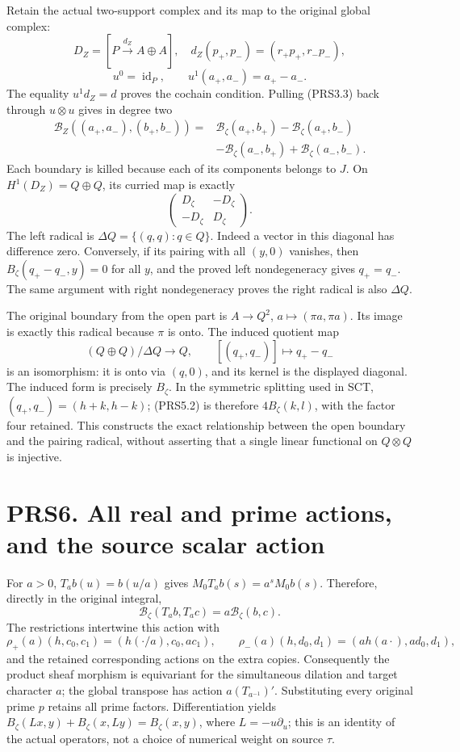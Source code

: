 Retain the actual two-support complex and its map to the original global
complex: \[
D_Z=[P\xrightarrow{d_Z}A\oplus A],\quad
d_Z(p_+,p_-)=(r_+p_+,r_-p_-),
\] \[
u^0=\operatorname{id}_P,\qquad u^1(a_+,a_-)=a_+-a_-.
\tag{PRS5.1}
\] The equality \(u^1d_Z=d\) proves the cochain condition. Pulling
(PRS3.3) back through \(u\otimes u\) gives in degree two \[
\begin{aligned}
\mathcal B_Z((a_+,a_-),(b_+,b_-))={}&\mathcal B_\zeta(a_+,b_+)-\mathcal B_\zeta(a_+,b_-)\\
&-\mathcal B_\zeta(a_-,b_+)+\mathcal B_\zeta(a_-,b_-).
\end{aligned}
\tag{PRS5.2}
\] Each boundary is killed because each of its components belongs to
\(J\). On \(H^1(D_Z)=Q\oplus Q\), its curried map is exactly \[
\begin{pmatrix}D_\zeta&-D_\zeta\\-D_\zeta&D_\zeta\end{pmatrix}.
\tag{PRS5.3}
\] The left radical is \(\Delta Q=\{(q,q):q\in Q\}\). Indeed a vector in
this diagonal has difference zero. Conversely, if its pairing with all
\((y,0)\) vanishes, then \(B_\zeta(q_+-q_-,y)=0\) for all \(y\), and the
proved left nondegeneracy gives \(q_+=q_-\). The same argument with
right nondegeneracy proves the right radical is also \(\Delta Q\).

The original boundary from the open part is \(A\to Q^2\),
\(a\mapsto(\pi a,\pi a)\). Its image is exactly this radical because
\(\pi\) is onto. The induced quotient map \[
(Q\oplus Q)/\Delta Q\longrightarrow Q,\qquad [(q_+,q_-)]\longmapsto q_+-q_-
\tag{PRS5.4}
\] is an isomorphism: it is onto via \((q,0)\), and its kernel is the
displayed diagonal. The induced form is precisely \(B_\zeta\). In the
symmetric splitting used in SCT, \((q_+,q_-)=(h+k,h-k)\); (PRS5.2) is
therefore \(4B_\zeta(k,l)\), with the factor four retained. This
constructs the exact relationship between the open boundary and the
pairing radical, without asserting that a single linear functional on
\(Q\otimes Q\) is injective.

\section{PRS6. All real and prime actions, and the source scalar
action}\label{prs6.-all-real-and-prime-actions-and-the-source-scalar-action}

For \(a>0\), \(T_ab(u)=b(u/a)\) gives \(M_0T_ab(s)=a^sM_0b(s)\).
Therefore, directly in the original integral, \[
\mathcal B_\zeta(T_ab,T_ac)=a\mathcal B_\zeta(b,c).
\tag{PRS6.1}
\] The restrictions intertwine this action with \[
\rho_+(a)(h,c_0,c_1)=(h(\cdot/a),c_0,ac_1),\qquad
\rho_-(a)(h,d_0,d_1)=(a h(a\cdot),ad_0,d_1),
\] and the retained corresponding actions on the extra copies.
Consequently the product sheaf morphism is equivariant for the
simultaneous dilation and target character \(a\); the global transpose
has action \(a(T_{a^{-1}})'\). Substituting every original prime \(p\)
retains all prime factors. Differentiation yields
\(B_\zeta(Lx,y)+B_\zeta(x,Ly)=B_\zeta(x,y)\), where \(L=-u\partial_u\);
this is an identity of the actual operators, not a choice of numerical
weight on source \(\tau\).

